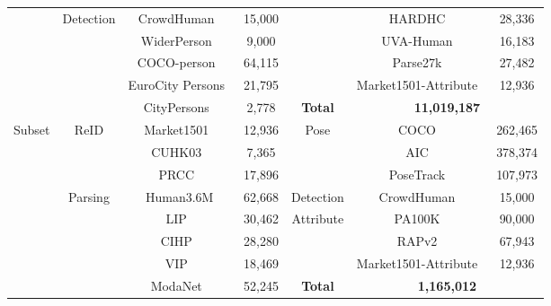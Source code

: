 \documentclass[10pt,twocolumn,letterpaper]{article}
\begin{document}
\begin{table*}[t]
\begin{tabular}{c|c|cc|c|cc}
\cline{2-4}          & \multirow{5}[4]{*}{Detection} & CrowdHuman~\cite{shao2018crowdhuman} & 15,000  &       & HARDHC~\cite{li2016human} & 28,336  \\
          &       & WiderPerson~\cite{zhang2019widerperson} & 9,000  &       & UVA-Human~\cite{li2021uav} & 16,183  \\
          &       & COCO-person~\cite{lin2014microsoft} & 64,115  &       & Parse27k~\cite{PARSE27k} & 27,482  \\
          &       & EuroCity Persons~\cite{braun2018eurocity} & 21,795  &       & Market1501-Attribute~\cite{zheng2015scalable} & 12,936  \\
\cline{5-7}          &       & CityPersons~\cite{zhang2017citypersons} & 2,778  & \textbf{Total } & \multicolumn{2}{c}{\textbf{11,019,187}} \\
    \hline\hline
    \multirow{8}[8]{*}{Subset} & \multirow{3}[2]{*}{ReID} & Market1501~\cite{zheng2015scalable} & 12,936  & \multirow{3}[2]{*}{Pose} & COCO~\cite{lin2014microsoft}  & 262,465  \\
          &       & CUHK03~\cite{li2014deepreid} & 7,365  &       & AIC~\cite{wu2019large}   & 378,374  \\
          &       & PRCC~\cite{yang2019person}  & 17,896  &       & PoseTrack~\cite{andriluka2018posetrack} & 107,973  \\
\cline{2-7}          & \multirow{5}[6]{*}{Parsing} & Human3.6M & 62,668  & Detection & CrowdHuman~\cite{shao2018crowdhuman} & 15,000  \\
\cline{5-7}          &       & LIP~\cite{gong2017look}   & 30,462  & \multirow{3}[2]{*}{Attribute} & PA100K~\cite{liu2017hydraplus} & 90,000  \\
          &       & CIHP~\cite{gong2018instance}  & 28,280  &       & RAPv2~\cite{li2018richly} & 67,943  \\
          &       & VIP~\cite{zhou2018adaptive}   & 18,469  &       & Market1501-Attribute~\cite{zheng2015scalable} & 12,936  \\
\cline{5-7}          &       & ModaNet~\cite{zheng2018modanet} & 52,245  & \textbf{Total } & \multicolumn{2}{c}{\textbf{1,165,012 }} \\
    \hline
    \end{tabular}\label{tab:dataset statistics}\end{table*}
\end{document}
